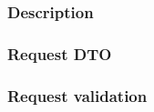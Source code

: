 \documentclass[../main.tex]{subfiles}
\begin{document}

\subsubsection*{Description}


\subsubsection*{Request DTO}


\subsubsection*{Request validation}



\end{document}

